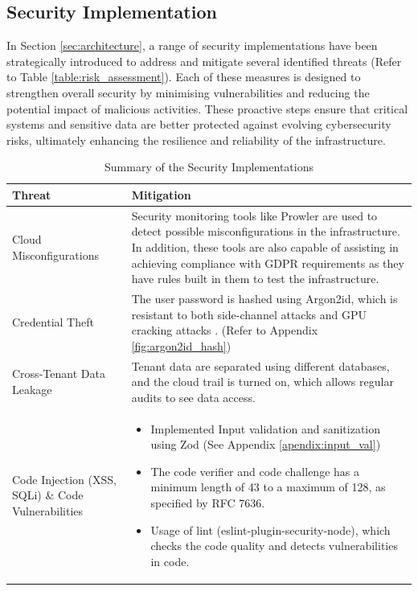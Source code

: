 \newpage
\subsection{Security Implementation}
\label{sec:sec_impl}
In Section \ref{sec:architecture}, a range of security implementations have been strategically introduced to address and mitigate several identified threats (Refer to Table \ref{table:risk_assessment}). Each of these measures is designed to strengthen overall security by minimising vulnerabilities and reducing the potential impact of malicious activities. These proactive steps ensure that critical systems and sensitive data are better protected against evolving cybersecurity risks, ultimately enhancing the resilience and reliability of the infrastructure. 

\begin{longtable}{|p{5cm}|p{10cm}|}
    \caption{Summary of the Security Implementations}
    \label{table:sec_impl}
\hline
\rowcolor{grey!15}
\textbf{Threat} & \textbf{Mitigation} \\
\hline
\endhead
\hline
\endfoot
Cloud Misconfigurations & Security monitoring tools like Prowler are used to detect possible misconfigurations in the infrastructure. In addition, these tools are also capable of assisting in achieving compliance with GDPR requirements as they have rules built in them to test the infrastructure.  \\
\hline
Credential Theft & The user password is hashed using Argon2id, which is resistant to both side-channel attacks and GPU cracking attacks \citep{argon2id}. (Refer to Appendix \ref{fig:argon2id_hash})  \\
\hline
Cross-Tenant Data Leakage & Tenant data are separated using different databases, and the cloud trail is turned on, which allows regular audits to see data access. \\
\hline
Code Injection (XSS, SQLi) \& Code Vulnerabilities & \begin{itemize}
    \item Implemented Input validation and sanitization using Zod (See Appendix \ref{apendix:input_val})
    \item The code verifier and code challenge has a minimum length of 43 to a maximum of 128, as specified by RFC 7636.
    \item Usage of lint (eslint-plugin-security-node), which checks the code quality and detects vulnerabilities in code.
    

\end{itemize}
\end{longtable}
